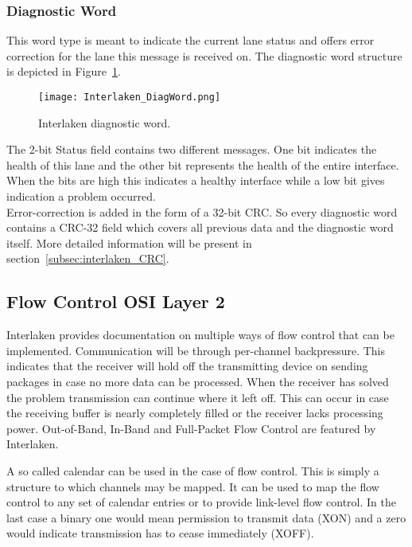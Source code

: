 	\subsubsection{Diagnostic Word}
	This word type is meant to indicate the current lane status and offers error correction for the lane this message is received on. The diagnostic word structure is depicted in Figure~\ref{Fig:Interlaken_DiagWord}.
	
	\begin{figure}[H]
		\centering
		\texttt{[image: Interlaken\_DiagWord.png]}	
		\caption{Interlaken diagnostic word.}
		\label{Fig:Interlaken_DiagWord}
	\end{figure}
	
	The 2-bit Status field contains two different messages. One bit indicates the health of this lane and the other bit represents the health of the entire interface. When the bits are high this indicates a healthy interface while a low bit gives indication a problem occurred.\\
	
	Error-correction is added in the form of a 32-bit CRC. So every diagnostic word contains a CRC-32 field which covers all previous data and the diagnostic word itself. More detailed information will be present in section~\ref{subsec:interlaken_CRC}.
\newpage


\subsection[Flow Control]{Flow Control \hfill OSI Layer 2}
	\label{subsec:interlaken_flowcontrol}
	Interlaken provides documentation on multiple ways of flow control that can be implemented. Communication will be through per-channel backpressure. This indicates that the receiver will hold off the transmitting device on sending packages in case no more data can be processed. When the receiver has solved the problem transmission can continue where it left off. This can occur in case the receiving buffer is nearly completely filled or the receiver lacks processing power. Out-of-Band, In-Band and Full-Packet Flow Control are featured by Interlaken.
	
	A so called calendar can be used in the case of flow control. This is simply a structure to which channels may be mapped. It can be used to map the flow control to any set of calendar entries or to provide link-level flow control. In the last case a binary one would mean permission to transmit data (XON) and a zero would indicate transmission has to cease immediately (XOFF).
	
